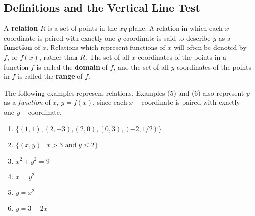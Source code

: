 \subsection{Definitions and the Vertical Line Test}

\pp

A {\bf relation} $R$ is a set of points in the $xy$-plane.  A relation in which each $x$-coordinate is paired with exactly one $y$-coordinate is said to describe $y$ as a {\bf function} of $x$.  Relations which represent functions of $x$ will often be denoted by $f$, or $f(x)$, rather than $R$.  The set of all $x$-coordinates of the points in a function $f$ is called the {\bf domain} of $f$, and the set of all $y$-coordinates of the points in $f$ is called the {\bf range} of $f$.\par

\begin{example}

The following examples represent relations.  Examples (5) and (6) also represent $y$ as a \textit{function} of $x$, $y=f(x)$, since each $x-$coordinate is paired with exactly one $y-$coordinate.

\begin{enumerate}
\item $\{(1,1),(2,-3),(2,0),(0,3),(-2,1/2)\}$
\item $\{(x,y)~|~x>3 \text{~and~} y\leq 2\}$
\item $x^2+y^2=9$
\item $x=y^2$
\item $y=x^2$
\item $y=3-2x$
\end{enumerate}
\end{example}

